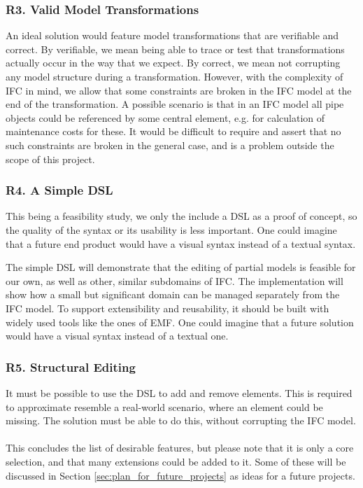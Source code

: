 \subsubsection{R3. Valid Model Transformations}
An ideal solution would feature model transformations that are verifiable and correct. By verifiable, we mean being able to trace or test that transformations actually occur in the way that we expect. By correct, we mean not corrupting any model structure during a transformation. However, with the complexity of IFC in mind, we allow that some constraints are broken in the IFC model at the end of the transformation. A possible scenario is that in an IFC model all pipe objects could be referenced by some central element, e.g. for calculation of maintenance costs for these. It would be difficult to require and assert that no such constraints are broken in the general case, and is a problem outside the scope of this project.

\subsubsection{R4. A Simple DSL}
This being a feasibility study, we only the include a DSL as a proof of concept, so the quality of the syntax or its usability is less important. One could imagine that a future end product would have a visual syntax instead of a textual syntax.

The simple DSL will demonstrate that the editing of partial models is feasible for our own, as well as other, similar subdomains of IFC. The implementation will show how a small but significant domain can be managed separately from the IFC model. To support extensibility and reusability, it should be built with widely used tools like the ones of EMF.  One could imagine that a future solution would have a visual syntax instead of a textual one.

\subsubsection{R5. Structural Editing}
It must be possible to use the DSL to add and remove elements. This is required to approximate resemble a real-world scenario, where an element could be missing. The solution must be able to do this, without corrupting the IFC model.

\paragraph{}
This concludes the list of desirable features, but please note that it is only a core selection, and that many extensions could be added to it. Some of these will be discussed in Section \ref{sec:plan_for_future_projects} as ideas for a future projects.

